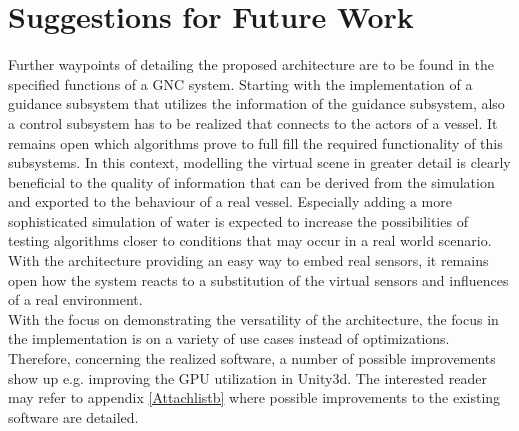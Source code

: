  	\section{Suggestions for Future Work} \label{Sug}
	Further waypoints of detailing the proposed architecture are to be found in the specified functions of a \ac{GNC} system. Starting with the implementation of a guidance subsystem that utilizes the information of the guidance subsystem, also a control subsystem has to be realized that connects to the actors of a vessel. It remains open which algorithms prove to full fill the required functionality of this subsystems. In this context, modelling the virtual scene in greater detail is clearly beneficial to the quality of information that can be derived from the simulation and exported to the behaviour of a real vessel. Especially adding a more sophisticated simulation of water is expected to increase the possibilities of testing algorithms closer to conditions that may occur in a real world scenario.  With the architecture providing an easy way to embed real sensors, it remains open how the system reacts to a substitution of the virtual sensors and influences of a real environment.\\
	
	 With the focus on demonstrating the versatility of the architecture, the focus in the implementation is on a variety of use cases instead of optimizations. Therefore, concerning the realized software, a number of possible improvements show up e.g. improving the GPU utilization in Unity3d. The interested reader may refer to appendix \ref{Attachlistb} where possible improvements to the existing software are detailed.
